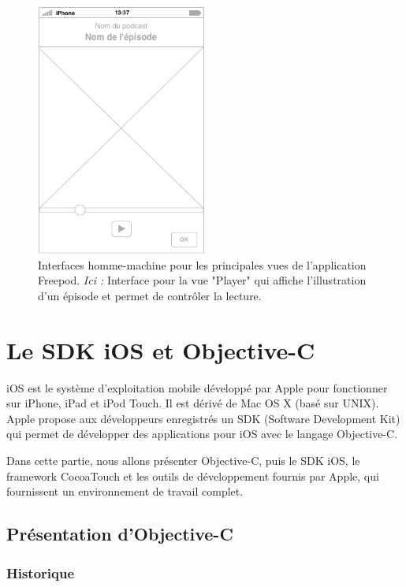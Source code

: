 \documentclass[11pt, french]{report}
\begin{document}
\begin{figure}[!h]
	\begin{center}
	\includegraphics[width=5.6cm]{ihm_player.png}
	\caption{\small{Interfaces homme-machine pour les principales vues de l'application Freepod. \textit{Ici :} Interface pour la vue "Player" qui affiche l'illustration d'un épisode et permet de contrôler la lecture.}} \label{classes}
	\end{center}
\end{figure}




\chapter{Le SDK iOS et Objective-C}

iOS est le système d’exploitation mobile développé par Apple pour fonctionner sur iPhone, iPad et iPod Touch. Il est dérivé de Mac OS X (basé sur UNIX). Apple propose aux développeurs enregistrés un SDK (Software Development Kit) qui permet de développer des applications pour iOS avec le langage Objective-C.

Dans cette partie, nous allons présenter Objective-C, puis le SDK iOS, le framework CocoaTouch et les outils de développement fournis par Apple, qui fournissent un environnement de travail complet. 

\section{Présentation d'Objective-C}

\subsection{Historique}
\end{document}

